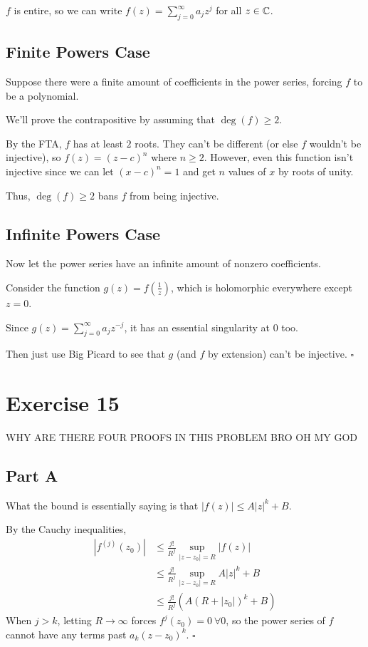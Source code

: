 \documentclass[12pt]{article}
\begin{document}
$f$ is entire, so we can write $f(z)=\sum_{j=0}^{\infty} a_jz^j$ for all $z \in \mathbb{C}$.

\subsection{Finite Powers Case}

Suppose there were a finite amount of coefficients in the power series, forcing $f$ to be a polynomial.

We'll prove the contrapositive by assuming that $\deg(f) \ge 2$.

By the FTA, $f$ has at least $2$ roots.
They can't be different (or else $f$ wouldn't be injective), so $f(z)=(z-c)^n$ where $n \ge 2$.
However, even this function isn't injective since we can let
$(x-c)^n=1$ and get $n$ values of $x$ by roots of unity.

Thus, $\deg(f) \ge 2$ bans $f$ from being injective.

\subsection{Infinite Powers Case}

Now let the power series have an infinite amount of nonzero coefficients.

Consider the function $g(z)=f\left(\frac{1}{z}\right)$, which is holomorphic everywhere except $z=0$.

Since $g(z)=\sum_{j=0}^{\infty} a_jz^{-j}$, it has an essential singularity at $0$ too.

Then just use Big Picard to see that $g$ (and $f$ by extension) can't be injective. $\square$

\pagebreak

\section{Exercise 15}

WHY ARE THERE FOUR PROOFS IN THIS PROBLEM BRO OH MY GOD

\subsection{Part A}

What the bound is essentially saying is that $|f(z)| \le A|z|^k+B$.

By the Cauchy inequalities,
\begin{align*}
  \left|f^{(j)}(z_0)\right|
   & \le \frac{j!}{R^j} \sup_{|z-z_0|=R} |f(z)|       \\
   & \le \frac{j!}{R^j} \sup_{|z-z_0|=R} A|z|^k+B \\
   & \le \frac{j!}{R^j}\left(A(R+|z_0|)^k+B\right)
\end{align*}
When $j > k$, letting $R \to \infty$ forces $f^{j}(z_0)=0\ \forall 0$,
so the power series of $f$ cannot have any terms past $a_k(z-z_0)^k$. $\square$
\end{document}
